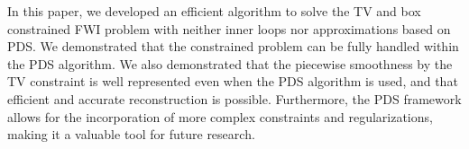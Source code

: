 In this paper, we developed an efficient algorithm to solve the TV and box constrained FWI problem with neither inner loops nor approximations based on PDS.
We demonstrated that the constrained problem can be fully handled within the PDS algorithm.
We also demonstrated that the piecewise smoothness by the TV constraint is well represented even when the PDS algorithm is used, and that efficient and accurate reconstruction is possible.
Furthermore, the PDS framework allows for the incorporation of more complex constraints and regularizations, making it a valuable tool for future research.

